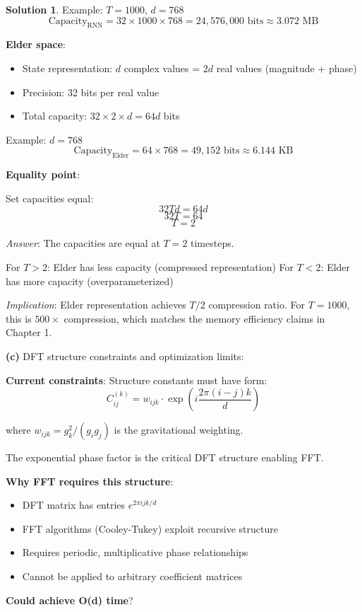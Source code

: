 \documentclass[12pt,a4paper]{book}
\theoremstyle{definition}
\newtheorem{solution}{Solution}[section]
\theoremstyle{remark}
\begin{document}
\begin{solution}
Example: $T=1000$, $d=768$
$$\text{Capacity}_{\text{RNN}} = 32 \times 1000 \times 768 = 24,576,000 \text{ bits} \approx 3.072 \text{ MB}$$

\textbf{Elder space}:
\begin{itemize}
\item State representation: $d$ complex values = $2d$ real values (magnitude + phase)
\item Precision: 32 bits per real value
\item Total capacity: $32 \times 2 \times d = 64d$ bits
\end{itemize}

Example: $d=768$
$$\text{Capacity}_{\text{Elder}} = 64 \times 768 = 49,152 \text{ bits} \approx 6.144 \text{ KB}$$

\textbf{Equality point}:

Set capacities equal:
$$32Td = 64d$$
$$32T = 64$$
$$T = 2$$

\textit{Answer}: The capacities are equal at $T=2$ timesteps.

For $T > 2$: Elder has less capacity (compressed representation)  
For $T < 2$: Elder has more capacity (overparameterized)

\textit{Implication}: Elder representation achieves $T/2$ compression ratio. For $T=1000$, this is $500\times$ compression, which matches the memory efficiency claims in Chapter 1.

\textbf{(c)} DFT structure constraints and optimization limits:

\textbf{Current constraints}: Structure constants must have form:
$$C_{ij}^{(k)} = w_{ijk} \cdot \exp\left(i\frac{2\pi(i-j)k}{d}\right)$$

where $w_{ijk} = g_k^2/(g_i g_j)$ is the gravitational weighting.

The exponential phase factor is the critical DFT structure enabling FFT.

\textbf{Why FFT requires this structure}:
\begin{itemize}
\item DFT matrix has entries $e^{2\pi ijk/d}$
\item FFT algorithms (Cooley-Tukey) exploit recursive structure
\item Requires periodic, multiplicative phase relationships
\item Cannot be applied to arbitrary coefficient matrices
\end{itemize}

\textbf{Could achieve O(d) time}?


\end{solution}
\end{document}
